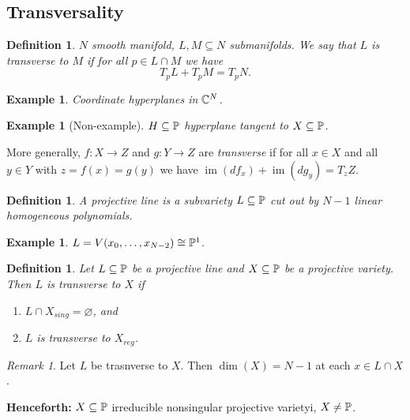 \documentclass[A4paper, british]{amsart}
\theoremstyle{darkgreentheorem}
\theoremstyle{darkbluedefinition}
\newtheorem{defn}[thm]{Definition}
\theoremstyle{darkredexample}
\newtheorem{exa}[thm]{Example}
\theoremstyle{remark}
\newtheorem{rem}[thm]{Remark}
\DeclareMathOperator{\im}{im}
\newcommand{\1}{\mathbbm{1}}
\newcommand{\sub}{\subseteq}
\begin{document}
\subsection{Transversality}

\begin{defn}
    $N$ smooth manifold, $L,M\sub N$ submanifolds.
    We say that $L$ is \textit{transverse} to $M$ if for all $p\in L\cap M$ we have
    \[ T_{p}L+T_{p}M=T_{p}N. \]
\end{defn}

\begin{exa}
    Coordinate hyperplanes in $\C^{N}$.
\end{exa}

\begin{exa}[Non-example]
    $H\sub \P$ hyperplane tangent to $X\sub \P$.
\end{exa}

More generally, $f\colon X\to Z$ and $g\colon Y\to Z$ are \textit{transverse} if for all $x\in X$ and all $y\in Y$ with $z=f(x)=g(y)$ we have $\im(df_{x})+\im(dg_{y})=T_{z}Z$.

\begin{defn}
    A \textit{projective line} is a subvariety $L\sub \P$ cut out by $N-1$ linear homogeneous polynomials.
\end{defn}

\begin{exa}
    $L=V(x_{0},\ldots,x_{N-2})\cong \P^{1}$.
\end{exa}

\begin{defn}
    Let $L\sub \P$ be a projective line and $X\sub \P$ be a projective variety.
    Then $L$ is \textit{transverse to $X$} if
    \begin{enumerate}
	\item $L\cap X_{sing}=\varnothing$, and
	\item $L$ is transverse to $X_{reg}$.
    \end{enumerate}
\end{defn}

\begin{rem}
    Let $L$ be trasnverse to $X$.
    Then $\dim(X)=N-1$ at each $x\in L\cap X$.
\end{rem}

\textbf{Henceforth:} $X\sub \P$ irreducible nonsingular projective varietyi, $X\neq \P$.
\end{document}
